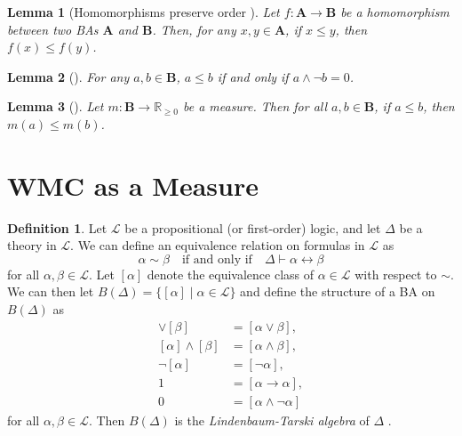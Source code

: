 \documentclass{article}
\newtheorem{lemma}{Lemma}
\theoremstyle{definition}
\newtheorem{definition}{Definition}
\theoremstyle{remark}
\begin{document}
\begin{lemma}[Homomorphisms preserve order
  \cite{givant2008introduction}] \label{lemma:homomorphisms_and_order}
  Let $f\colon \mathbf{A} \to \mathbf{B}$ be a homomorphism between two BAs
  $\mathbf{A}$ and $\mathbf{B}$. Then, for any $x, y \in \mathbf{A}$, if $x \le
  y$, then $f(x) \le f(y)$.
\end{lemma}

\begin{lemma}[\cite{sikorski1969boolean}] \label{lemma:order}
  For any $a, b \in \mathbf{B}$, $a \le b$ if and only if $a \land \neg b = 0$.
\end{lemma}

\begin{lemma}[\cite{givant2008introduction}] \label{lemma:measure_and_order}
  Let $m\colon \mathbf{B} \to \mathbb{R}_{\ge 0}$ be a measure. Then for all $a,
  b \in \mathbf{B}$, if $a \le b$, then $m(a) \le m(b)$.
\end{lemma}


\section{WMC as a Measure}

\begin{definition} \label{def:algebra_from_logic}
  Let $\mathcal{L}$ be a propositional (or first-order) logic, and let
  $\Delta$ be a theory in $\mathcal{L}$. We can define an equivalence
  relation on formulas in $\mathcal{L}$ as
  \[
    \alpha \sim \beta \quad \text{if and only if} \quad \Delta \vdash \alpha
    \leftrightarrow \beta
  \]
  for all $\alpha, \beta \in \mathcal{L}$. Let $[\alpha]$ denote the equivalence
  class of $\alpha \in \mathcal{L}$ with respect to $\sim$. We can then let
  $B(\Delta) = \{ [\alpha] \mid \alpha \in \mathcal{L} \}$ and define the
  structure of a BA on $B(\Delta)$ as
  \begin{align*}
    [\alpha] \lor [\beta] &= [\alpha \lor \beta], \\
    [\alpha] \land [\beta] &= [\alpha \land \beta], \\
    \neg[\alpha] &= [\neg\alpha], \\
    1 &= [\alpha \to \alpha], \\
    0 &= [\alpha \land \neg\alpha]
  \end{align*}
  for all $\alpha, \beta \in \mathcal{L}$. Then $B(\Delta)$ is the
  \emph{Lindenbaum-Tarski algebra} of $\Delta$
  \cite{koppelberg1989handbook,tarski1983logic}.
\end{definition}
\end{document}
